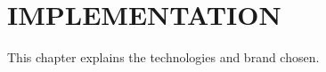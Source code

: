 \chapter{IMPLEMENTATION}
\label{chap:implementation}

This chapter explains the technologies and brand chosen.



% 


